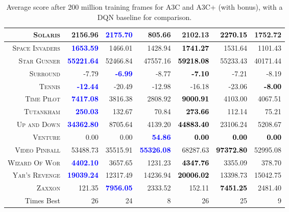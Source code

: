 \documentclass{article}
\begin{document}
{\begin{table}
{\begin{tabular}{|r|r|r|r||r|r|r|}
\hline
\textsc{Solaris} & 2156.96 & \textbf{\textcolor{blue}{2175.70}} & 805.66  & 2102.13 & \textbf{\textcolor{black}{2270.15}} & 1752.72  \\
\hline
\textsc{Space Invaders} & \textbf{\textcolor{blue}{1653.59}} & 1466.01 & 1428.94  & \textbf{\textcolor{black}{1741.27}} & 1531.64 & 1101.43  \\
\hline
\textsc{Star Gunner} & \textbf{\textcolor{blue}{55221.64}} & 52466.84 & 47557.16  & \textbf{\textcolor{black}{59218.08}} & 55233.43 & 40171.44  \\
\hline
\textsc{Surround} & -7.79 & \textbf{\textcolor{blue}{-6.99}} & -8.77  & \textbf{\textcolor{black}{-7.10}} & -7.21 & -8.19  \\
\hline
\textsc{Tennis} & \textbf{\textcolor{blue}{-12.44}} & -20.49 & -12.98  & -16.18 & -23.06 & \textbf{\textcolor{black}{-8.00}}  \\
\hline
\textsc{Time Pilot} & \textbf{\textcolor{blue}{7417.08}} & 3816.38 & 2808.92  & \textbf{\textcolor{black}{9000.91}} & 4103.00 & 4067.51  \\
\hline
\textsc{Tutankham} & \textbf{\textcolor{blue}{250.03}} & 132.67 & 70.84  & \textbf{\textcolor{black}{273.66}} & 112.14 & 75.21  \\
\hline
\textsc{Up and Down} & \textbf{\textcolor{blue}{34362.80}} & 8705.64 & 4139.20  & \textbf{\textcolor{black}{44883.40}} & 23106.24 & 5208.67  \\
\hline
\textsc{Venture} & 0.00 & 0.00 & \textbf{\textcolor{blue}{54.86}}  & \textbf{\textcolor{black}{0.00}} & \textbf{\textcolor{black}{0.00}} & \textbf{\textcolor{black}{0.00}}  \\
\hline
\textsc{Video Pinball} & 53488.73 & 35515.91 & \textbf{\textcolor{blue}{55326.08}}  & 68287.63 & \textbf{\textcolor{black}{97372.80}} & 52995.08  \\
\hline
\textsc{Wizard Of Wor} & \textbf{\textcolor{blue}{4402.10}} & 3657.65 & 1231.23  & \textbf{\textcolor{black}{4347.76}} & 3355.09 & 378.70  \\
\hline
\textsc{Yar's Revenge} & \textbf{\textcolor{blue}{19039.24}} & 12317.49 & 14236.94  & \textbf{\textcolor{black}{20006.02}} & 13398.73 & 15042.75  \\
\hline
\textsc{Zaxxon} & 121.35 & \textbf{\textcolor{blue}{7956.05}} & 2333.52  & 152.11 & \textbf{\textcolor{black}{7451.25}} & 2481.40  \\
\hline
\hline
Times Best  & 26 & 24 & 8  & 26 & 25 & 9  \\
\hline
\end{tabular}
}
\caption{Average score after 200 million training frames for A3C and  A3C+ (with  bonus), with a DQN baseline for comparison.\label{table:all_the_a3c_results}}
\end{table}

}
\end{document}
